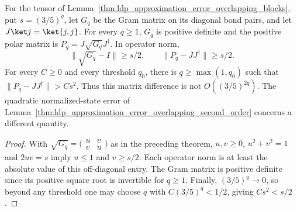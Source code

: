 \begin{lemma}
    \label{thm:ldp_overlapping_polar_norm_lower_bound}
    \leanok
    For the tensor of Lemma~\ref{thm:ldp_approximation_error_overlapping_blocks},
    put $s=(3/5)^q$, let $G_q$ be the Gram matrix on its diagonal bond pairs,
    and let $J\ket j=\ket{j,j}$. For every $q\ge1$, $G_q$ is positive definite
    and the positive polar matrix is $P_q=J\sqrt{G_q}J^\dagger$. In operator norm,
    \[
        \lVert\sqrt{G_q}-I\rVert\ge s/2,
        \qquad \lVert P_q-JJ^\dagger\rVert\ge s/2.
    \]
    For every $C\ge0$ and every threshold $q_0$, there is $q\ge\max(1,q_0)$
    such that $\lVert P_q-JJ^\dagger\rVert>Cs^2$. Thus this matrix difference
    is not $O((3/5)^{2q})$. The quadratic normalized-state error of
    Lemma~\ref{thm:ldp_approximation_error_overlapping_second_order}
    concerns a different quantity.
\end{lemma}
\begin{proof}\leanok
    With $\sqrt{G_q}=\bigl(\begin{smallmatrix}u&v\\v&u\end{smallmatrix}\bigr)$
    as in the preceding theorem, $u,v\ge0$, $u^2+v^2=1$ and $2uv=s$ imply
    $u\le1$ and $v\ge s/2$. Each operator norm is at least the
    absolute value of this off-diagonal entry. The Gram matrix is positive
    definite since its positive square root is invertible for $q\ge1$.
    Finally, $(3/5)^q\to0$, so beyond any threshold one may choose $q$ with
    $C(3/5)^q<1/2$, giving $Cs^2<s/2$.
\end{proof}

